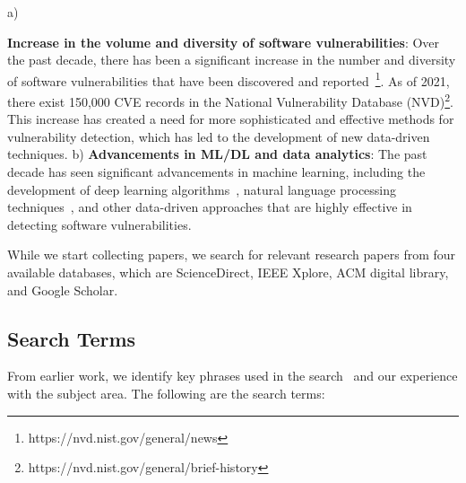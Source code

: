 a) {\textbf{Increase in the volume and diversity of software vulnerabilities}: Over the past decade, there has been a significant increase in the number and diversity of software vulnerabilities that have been discovered and reported~\footnote{https://nvd.nist.gov/general/news}. As of 2021, there exist 150,000 CVE records in the National Vulnerability Database (NVD)\footnote{https://nvd.nist.gov/general/brief-history}. This increase has created a need for more sophisticated and effective methods for vulnerability detection, which has led to the development of new data-driven techniques.
b) \textbf{Advancements in ML/DL and data analytics}: The past decade has seen significant advancements in machine learning, including the development of deep learning algorithms~\cite{goodfellow2020generative, hinton2006fast}, natural language processing techniques~\cite{devlin2018bert, liu2019roberta}, and other data-driven approaches that are highly effective in detecting software vulnerabilities.

While we start collecting papers, we search for relevant research papers from four available databases, which are ScienceDirect, IEEE Xplore, ACM digital library, and Google Scholar. 
\subsection{Search Terms}
From earlier work, we identify key phrases used in the search~\cite{le2021survey,lin2020software,zeng2020software,semasaba2020literature} and our experience with the subject area. The following are the search terms: 


\noindent{}

}
